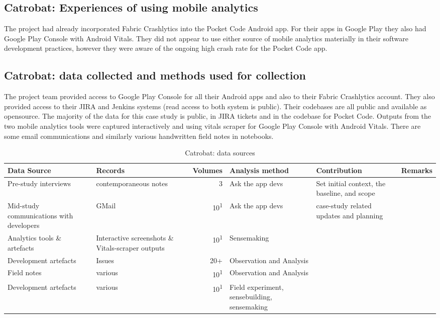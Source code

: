 \subsection{Catrobat: Experiences of using mobile analytics}
The project had already incorporated Fabric Crashlytics into the Pocket Code Android app. %
For their apps in Google Play they also had Google Play Console with Android Vitals. They did not appear to use either source of mobile analytics materially in their software development practices, however they were aware of the ongoing high crash rate for the Pocket Code app. %

\subsection{Catrobat: data collected and methods used for collection}
The project team provided access to Google Play Console for all their Android apps and also to their Fabric Crashlytics account. They also provided access to their JIRA and Jenkins systems (read access to both system is public). Their codebases are all public and available as opensource. The majority of the data for this case study is public, in JIRA tickets and in the codebase for Pocket Code. Outputs from the two mobile analytics tools were captured interactively and using vitals scraper for Google Play Console with Android Vitals. There are some email communications and similarly various handwritten field notes in notebooks.


\begin{table}
    \centering
    \footnotesize
    \tabcolsep=0.12cm
    \begin{tabular}{p{2.4cm}p{2.4cm}rp{2.4cm}p{3cm}p{2.5cm}}
        Data Source & Records & Volumes & Analysis method & Contribution & Remarks \\
        \toprule
         Pre-study interviews & contemporaneous notes\footnotemark & 3 & Ask the app devs & Set initial context, the baseline, and scope &  \\
         Mid-study communications with developers & GMail & 10\textsuperscript{1} & Ask the app devs & case-study related updates and planning &  \\
         Analytics tools \& artefacts & Interactive screenshots \& Vitals-scraper outputs &10\textsuperscript{1} & Sensemaking &  &  \\
         Development artefacts & Issues & 20+ & Observation and Analysis & & \\
         Field notes & various & 10\textsuperscript{1} & Observation and Analysis & & \\
         Development artefacts & various\footnotemark & 10\textsuperscript{1} & Field experiment, sensebuilding, sensemaking & & \\
         \bottomrule
    \end{tabular}
    \caption{Catrobat: data sources}
    \label{tab:catrobat-data-sources}
\end{table}

